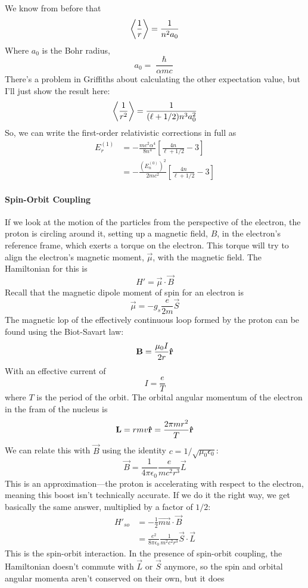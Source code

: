 \documentclass[a4paper]{article}
\begin{document}
	We know from before that
	\[ \left\langle \frac{1}{r}\right\rangle = \frac{1}{n^2 a_0} \]
	Where $a_0$ is the Bohr radius,
	\[ a_0 = \frac{\hslash}{\alpha mc} \]
	There's a problem in Griffiths about calculating the other expectation
	value, but I'll just show the result here:
	\[ \left\langle \frac{1}{r^2}\right\rangle = \frac{1}{(\ell+1/2)n^3a_0^2} \]
	So, we can write the first-order relativistic corrections in full as
	\begin{align*}
		E_r^{(1)} &=
	-\frac{mc^2\alpha^4}{8n^4}\left[\frac{4n}{\ell+1/2} - 3\right]\\
	&= -\frac{(E_n^{(0)})^2}{2mc^2}\left[\frac{4n}{\ell+1/2}-3\right]
	\end{align*}
\paragraph{Spin-Orbit Coupling}
If we look at the motion of the particles from the perspective of the electron,
the proton is circling around it, setting up a magnetic field, $B$, in the
electron's reference frame, which exerts a torque on the electron. This
torque will try to align the electron's magnetic moment, $\vec{\mu}$, with the
magnetic field. The Hamiltonian for this is
\[ H' = \vec{\mu}\cdot\vec{B} \]
Recall that the magnetic dipole moment of spin for an electron is
\[ \vec{\mu} = -g_s\frac{e}{2m}\vec{S} \]
The magnetic lop of the effectively continuous loop formed by the proton can
be found using the Biot-Savart law:
\[ \boldsymbol{\mathbf{B}} = \frac{\mu_0 I}{2r}\boldsymbol{\mathbf{\hat{r}}} \]
With an effective current of
\[ I = \frac{e}{T} \]
where $T$ is the period of the orbit. The orbital angular momentum of the
electron in the fram of the nucleus is
\[ \boldsymbol{\mathbf{L}} = rmv\boldsymbol{\mathbf{\hat{r}}} = \frac{2\pi mr^2}{T}\boldsymbol{\mathbf{\hat{r}}} \]
We can relate this with $\vec{B}$ using the identity
$c = 1/\sqrt{\mu_0\epsilon_0}$:
\[ \vec{B} = \frac{1}{4\pi\epsilon_0}\frac{e}{mc^2r^3}\vec{L} \]
This is an approximation---the proton is accelerating with respect to the
electron, meaning this boost isn't technically accurate. If we do it the
right way, we get basically the same answer, multiplied by a factor of
$1/2$:
\begin{align*}
	H'_{so} &= -\frac{1}{2}\vec{mu}\cdot\vec{B}\\
		&= \frac{e^2}{8\pi\epsilon_0}\frac{1}{m^2c^2r^3}
			\vec{S}\cdot\vec{L}
\end{align*}
This is the spin-orbit interaction. In the presence of spin-orbit coupling, the
Hamiltonian doesn't commute with $\vec{L}$ or $\vec{S}$ anymore, so the
spin and orbital angular momenta aren't conserved on their own, but it does
\end{document}
